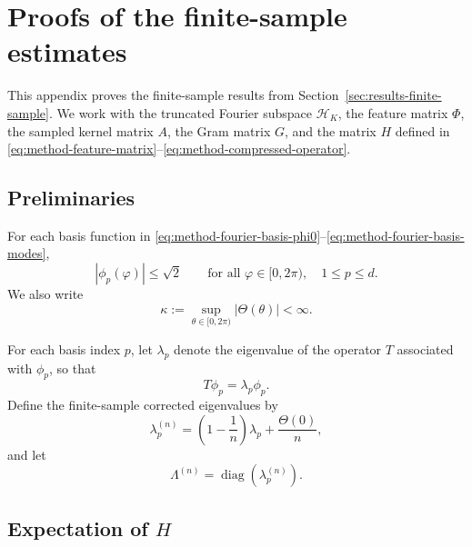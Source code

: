 \chapter{Proofs of the finite-sample estimates}
\label{app:finite-sample-proofs}

This appendix proves the finite-sample results from
Section~\ref{sec:results-finite-sample}. We work with the truncated Fourier subspace
\(\mathcal H_K\), the feature matrix \(\Phi\), the sampled kernel matrix \(A\), the Gram matrix
\(G\), and the matrix \(H\) defined in
\eqref{eq:method-feature-matrix}--\eqref{eq:method-compressed-operator}.

\section{Preliminaries}
\label{sec:app-preliminaries}

For each basis function in
\eqref{eq:method-fourier-basis-phi0}--\eqref{eq:method-fourier-basis-modes},
\begin{equation}
	|\phi_p(\varphi)|\le \sqrt2
	\qquad
	\text{for all }\varphi\in[0,2\pi),\quad 1\le p\le d.
	\label{eq:app-basis-bound}
\end{equation}
We also write
\begin{equation}
	\kappa:=\sup_{\theta\in[0,2\pi)}|\Theta(\theta)|<\infty.
	\label{eq:app-kappa}
\end{equation}

For each basis index \(p\), let \(\lambda_p\) denote the eigenvalue of the operator \(T\)
associated with \(\phi_p\), so that
\[
	T\phi_p=\lambda_p \phi_p.
\]
Define the finite-sample corrected eigenvalues by
\begin{equation}
	\lambda_p^{(n)}
	=
	\left(1-\frac{1}{n}\right)\lambda_p+\frac{\Theta(0)}{n},
	\label{eq:app-finite-sample-corrected-eigs}
\end{equation}
and let
\[
	\Lambda^{(n)}=\operatorname{diag}(\lambda_p^{(n)}).
\]

\section{Expectation of \(H\)}
\label{sec:app-expected-H}


